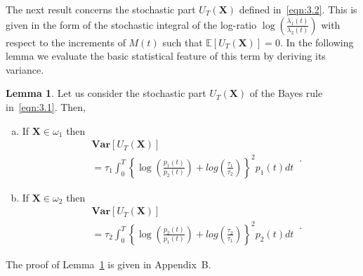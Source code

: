 \documentclass[lettersize,journal,onecolumn]{IEEEtran}
\theoremstyle{definition}
\newtheorem{lemma}{Lemma}
\newcommand{\E}[1]{\mathbb{E}\left[#1\right]}
\newcommand{\Var}[1]{\mathbf{Var}\left[#1\right]}
\begin{document}
The next result concerns the stochastic part $U_{T}(\mathbf{X})$ defined 
in~\eqref{eqn:3.2}. This is given in the form of the stochastic integral of the log-ratio 
$\log\left(\frac{\lambda_{1}(t)}{\lambda_{2}(t)}\right)$ with respect to the 
increments of $M(t)$ such that $\E{U_{T}(\mathbf{X})}=0$. In the following lemma we 
evaluate the basic statistical feature of this term by deriving its variance.
\begin{lemma}
	\label{lemma:2}
	Let us consider the stochastic part $U_T(\mathbf{X})$ of the Bayes rule 
	in~\eqref{eqn:3.1}. Then,
	\begin{enumerate}[(a)]
		\item If $\mathbf{X}\in\omega_{1}$ then
		\begin{equation}
			\begin{split}
				& \Var{U_{T}(\mathbf{X})} \\
				& =
				\tau_{1}\int_{0}^{T}\left\{
				\log\left(\frac{p_{1}(t)}{p_{2}(t)}\right)
				+ log\left(\frac{\tau_{1}}{\tau_{2}}\right)
				\right\}^2 p_{1}(t)dt
			\end{split}
			\label{eqn:3.5}\,.
		\end{equation}
		\item If $\mathbf{X}\in\omega_{2}$ then
		\begin{equation}
			\begin{split}
				& \Var{U_{T}(\mathbf{X})} \\
				& =
				\tau_{2}\int_{0}^{T}\left\{
				\log\left(\frac{p_{2}(t)}{p_{1}(t)}\right)
				+ log\left(\frac{\tau_{2}}{\tau_{1}}\right)
				\right\}^2 p_{2}(t)dt
			\end{split}
			\label{eqn:3.6}\,.
		\end{equation}
	\end{enumerate}
	The proof of Lemma~\ref{lemma:2} is given in Appendix~B.
\end{lemma}
\end{document}
